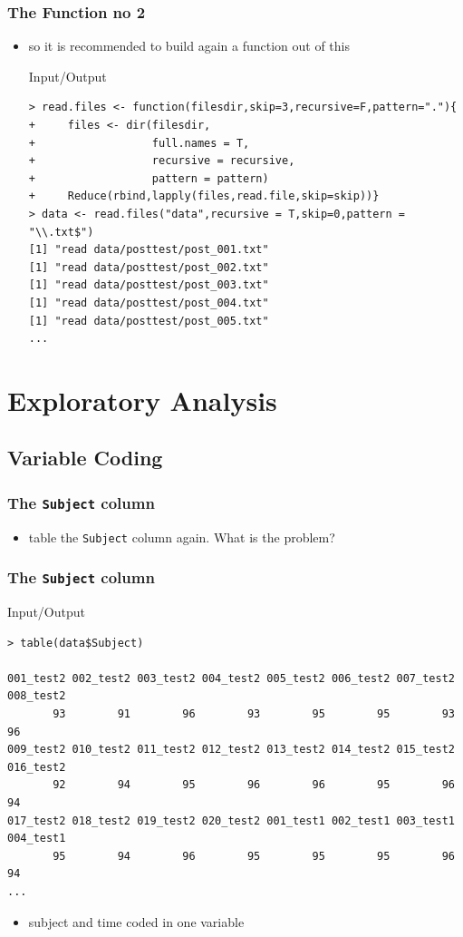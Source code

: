 \documentclass[xcolor={table},c]{beamer}
\begin{document}
\begin{frame}[fragile]\frametitle{The Function no 2}
  \begin{itemize}
  \item so it is recommended to build again a function out of this
    \begin{exampleblock}{Input/Output}\scriptsize
\begin{verbatim}
> read.files <- function(filesdir,skip=3,recursive=F,pattern="."){
+     files <- dir(filesdir,
+                  full.names = T,
+                  recursive = recursive,
+                  pattern = pattern)
+     Reduce(rbind,lapply(files,read.file,skip=skip))}
> data <- read.files("data",recursive = T,skip=0,pattern = "\\.txt$")
[1] "read data/posttest/post_001.txt"
[1] "read data/posttest/post_002.txt"
[1] "read data/posttest/post_003.txt"
[1] "read data/posttest/post_004.txt"
[1] "read data/posttest/post_005.txt"
...
\end{verbatim}
    \end{exampleblock}
  \end{itemize}
\end{frame}

\section{Exploratory Analysis}
\subsection{Variable Coding}
\begin{frame}[fragile]\frametitle{The \texttt{Subject} column}
  \begin{itemize}
  \item table the \texttt{Subject} column again. What is the problem?
  \end{itemize}
\end{frame}


\begin{frame}[fragile]\frametitle{The \texttt{Subject} column}
\begin{exampleblock}{Input/Output}\scriptsize
\begin{verbatim}
> table(data$Subject)

001_test2 002_test2 003_test2 004_test2 005_test2 006_test2 007_test2 008_test2 
       93        91        96        93        95        95        93        96 
009_test2 010_test2 011_test2 012_test2 013_test2 014_test2 015_test2 016_test2 
       92        94        95        96        96        95        96        94 
017_test2 018_test2 019_test2 020_test2 001_test1 002_test1 003_test1 004_test1 
       95        94        96        95        95        95        96        94 
...
\end{verbatim}
    \end{exampleblock}
\begin{itemize}
\item subject and time coded in one variable
\end{itemize}
\end{frame}
\end{document}
